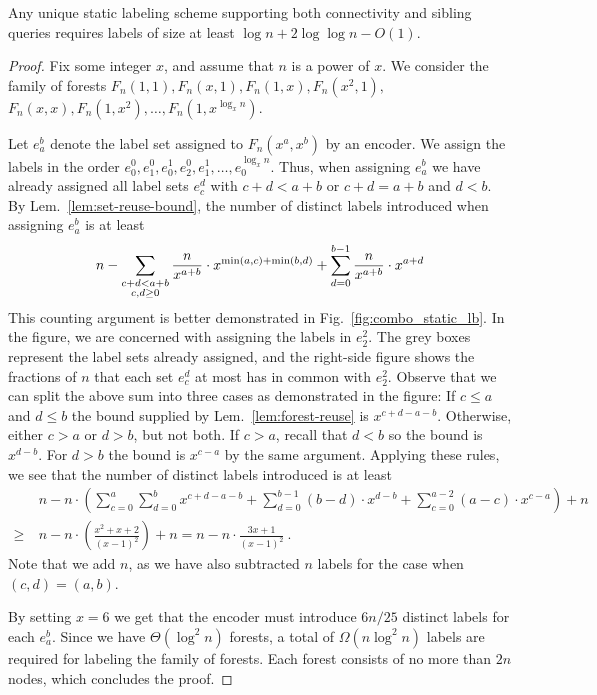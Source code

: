 \documentclass{llncs}
\begin{document}
\begin{theorem}\label{thm:static-combo-lb}
    Any unique static labeling scheme supporting both connectivity and sibling queries
    requires labels of size at  least  $\log n + 2\log\log n - O(1)$.
\end{theorem}
\begin{proof}
	Fix some integer $x$, and assume that $n$ is a power of $x$.
    We consider the family of forests $F_n(1,1), F_n(x,1), F_n(1,x),
    F_n(x^2,1),$ $F_n(x,x), F_n(1,x^2), \ldots,$\linebreak $F_n(1,x^{\log_x n})$.

    Let $e_a^b$ denote the label set assigned to $F_n(x^a,x^b)$ by an
        encoder. We  assign
        the labels in the order $e_0^0, e_1^0, e_0^1, e_2^0, e_1^1, \ldots,
        e_0^{\log_x n}$. Thus, when assigning $e_a^b$ we have already assigned
        all label sets $e_c^d$ with $c+d < a+b$ or $c+d = a+b$ and $d < b$. By
        Lem.~\ref{lem:set-reuse-bound}, the number of distinct labels introduced
        when assigning $e_a^b$ is at least
        \[
            n - \sum_{\substack{c+d<a+b\\c,d\ge 0}}
            \frac{n}{x^{a+b}}\cdot x^{\min(a,c)+\min(b,d)} +
            \sum_{d=0}^{b-1} \frac{n}{x^{a+b}}\cdot x^{a+d} \\
        \]
        This counting argument is better demonstrated in
        Fig.~\ref{fig:combo_static_lb}. In the figure, we are concerned with
        assigning the labels in $e_2^2$. The grey boxes represent the label
        sets already assigned, and the right-side figure shows the fractions of
        $n$ that each set $e_c^d$ at most has in common with $e_2^2$. Observe
        that we can split the above sum into three cases as demonstrated in the
        figure: If $c\le a$ and $d\le b$ the bound
        supplied by Lem.~\ref{lem:forest-reuse} is $x^{c+d-a-b}$. Otherwise,
        either $c>a$ or $d>b$, but not both. If $c>a$, recall
        that $d<b$ so the bound is $x^{d-b}$. For $d>b$ the bound is $x^{c-a}$
        by the same argument. Applying these rules, we see that the number of
        distinct labels introduced is at least
        \begin{align*}
        &n - n\cdot\left(\sum_{c=0}^a \sum_{d=0}^b x^{c+d-a-b} + \sum_{d=0}^{b-1}
        (b-d)\cdot x^{d-b} + \sum_{c=0}^{a-2} (a-c)\cdot x^{c-a}\right) + n \\
\ge\ &n - n\cdot\left(\frac{x^2 + x + 2}{(x-1)^2}\right)+n  = n - n\cdot \frac{3x+1}{(x-1)^2}\ .
        \end{align*}
        Note that we add $n$, as we have also subtracted $n$ labels for the
        case when $(c,d) = (a,b)$.

    By setting $x = 6$ we get that the encoder must introduce $6n/25$ distinct
    labels for each $e_a^b$. Since we have $\Theta(\log^2 n)$ forests, a total
    of $\Omega(n\log^2 n)$ labels are required for labeling the family of forests.
    Each forest consists of no more than $2n$ nodes, which concludes the proof.
\end{proof}
\end{document}
